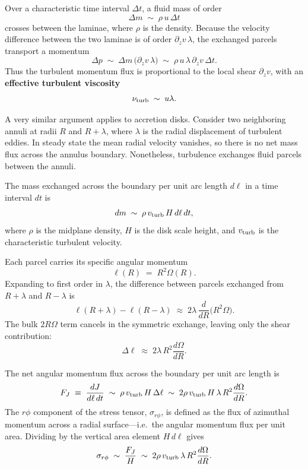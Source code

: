 Over a characteristic time interval $\Delta t$, a fluid mass of order
\[
\Delta m \;\sim\; \rho\, u \,\Delta t
\]
crosses between the laminae, where $\rho$ is the density. Because the velocity difference between the two laminae is of order $\partial_z v \, \lambda$,  the exchanged parcels transport a momentum
\[
\Delta p \;\sim\; \Delta m \,\bigl(\partial_z v \,\lambda \bigr)
      \;\sim\; \rho\, u \,\lambda \,\partial_z v \,\Delta t .
\]
Thus the turbulent momentum flux is proportional to the local shear $\partial_z v$, 
with an \textbf{effective turbulent viscosity}
\[
\nu_{\rm turb} \;\sim\; u \lambda .
\]

\medskip
A very similar argument applies to accretion disks.  
Consider two neighboring annuli at radii $R$ and $R+\lambda$, where $\lambda$ is the radial displacement of turbulent eddies. 
In steady state the mean radial velocity vanishes, so there is no net mass flux across the annulus boundary. 
Nonetheless, turbulence exchanges fluid parcels between the annuli.

The mass exchanged across the boundary per unit arc length $d\ell$ 
in a time interval $dt$ is
\[
dm \;\sim\; \rho \, v_{\rm turb} \, H \, d\ell \, dt ,
\]
where $\rho$ is the midplane density, $H$ is the disk scale height, 
and $v_{\rm turb}$ is the characteristic turbulent velocity.  

Each parcel carries its specific angular momentum
\[
\ell(R) \;=\; R^2 \Omega(R).
\]
Expanding to first order in $\lambda$, the difference between parcels exchanged from 
$R+\lambda$ and $R-\lambda$ is
\[
\ell(R+\lambda) - \ell(R-\lambda)
   \;\approx\; 2\lambda \,\frac{d}{dR}\!\bigl(R^2\Omega\bigr).
\]
The bulk $2R\Omega$ term cancels in the symmetric exchange, 
leaving only the shear contribution:
\[
\Delta \ell \;\approx\; 2\lambda \, R^2 \frac{d\Omega}{dR}.
\]

The net angular momentum flux across the boundary per unit arc length is
\[
F_J \;\equiv\; \frac{dJ}{d\ell\,dt}
   \;\sim\; \rho \, v_{\rm turb}\, H \, \Delta \ell
   \;\sim\; 2 \rho \, v_{\rm turb}\, H \, \lambda \, R^2 \frac{d\Omega}{dR}.
\]
The $r\phi$ component of the stress tensor, $\sigma_{r\phi}$, is defined
as the flux of azimuthal momentum across a radial surface—i.e.\ the angular momentum flux per unit area. 
Dividing by the vertical area element $H\,d\ell$ gives
\[
\sigma_{r\phi} \;\sim\; \frac{F_J}{H}
   \;\sim\; 2 \rho \, v_{\rm turb}\, \lambda \, R^2 \frac{d\Omega}{dR}.
\]

